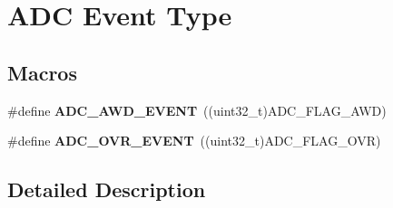 \hypertarget{group___a_d_c___event__type}{}\section{A\+DC Event Type}
\label{group___a_d_c___event__type}
\subsection*{Macros}
\begin{DoxyCompactItemize}
\item 
\mbox{\label{group___a_d_c___event__type_ga2d1d545ea1bfecba7a7081be6ef2cb93}} 
\#define {\bfseries A\+D\+C\+\_\+\+A\+W\+D\+\_\+\+E\+V\+E\+NT}~((uint32\+\_\+t)A\+D\+C\+\_\+\+F\+L\+A\+G\+\_\+\+A\+WD)
\item 
\mbox{\label{group___a_d_c___event__type_gae1ef5aaecb2d24cac50a59f1bc311221}} 
\#define {\bfseries A\+D\+C\+\_\+\+O\+V\+R\+\_\+\+E\+V\+E\+NT}~((uint32\+\_\+t)A\+D\+C\+\_\+\+F\+L\+A\+G\+\_\+\+O\+VR)
\end{DoxyCompactItemize}


\subsection{Detailed Description}

